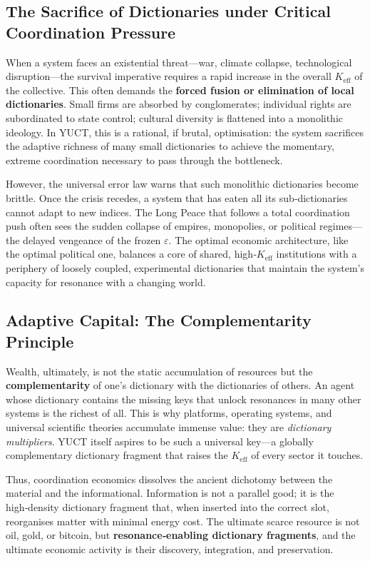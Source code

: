 \documentclass[12pt,a4paper]{article}
\newcommand{\Keff}{K_{\mathrm{eff}}}
\begin{document}
	\subsection{The Sacrifice of Dictionaries under Critical Coordination Pressure}
	
	When a system faces an existential threat—war, climate collapse, technological disruption—the survival imperative requires a rapid increase in the overall $\Keff$ of the collective. This often demands the \textbf{forced fusion or elimination of local dictionaries}. Small firms are absorbed by conglomerates; individual rights are subordinated to state control; cultural diversity is flattened into a monolithic ideology. In YUCT, this is a rational, if brutal, optimisation: the system sacrifices the adaptive richness of many small dictionaries to achieve the momentary, extreme coordination necessary to pass through the bottleneck.
	
	However, the universal error law warns that such monolithic dictionaries become brittle. Once the crisis recedes, a system that has eaten all its sub‑dictionaries cannot adapt to new indices. The Long Peace that follows a total coordination push often sees the sudden collapse of empires, monopolies, or political regimes—the delayed vengeance of the frozen $\varepsilon$. The optimal economic architecture, like the optimal political one, balances a core of shared, high‑$\Keff$ institutions with a periphery of loosely coupled, experimental dictionaries that maintain the system’s capacity for resonance with a changing world.
	
	\subsection{Adaptive Capital: The Complementarity Principle}
	
	Wealth, ultimately, is not the static accumulation of resources but the \textbf{complementarity} of one’s dictionary with the dictionaries of others. An agent whose dictionary contains the missing keys that unlock resonances in many other systems is the richest of all. This is why platforms, operating systems, and universal scientific theories accumulate immense value: they are \emph{dictionary multipliers}. YUCT itself aspires to be such a universal key—a globally complementary dictionary fragment that raises the $\Keff$ of every sector it touches.
	
	Thus, coordination economics dissolves the ancient dichotomy between the material and the informational. Information is not a parallel good; it is the high‑density dictionary fragment that, when inserted into the correct slot, reorganises matter with minimal energy cost. The ultimate scarce resource is not oil, gold, or bitcoin, but \textbf{resonance‑enabling dictionary fragments}, and the ultimate economic activity is their discovery, integration, and preservation.
	
\end{document}
